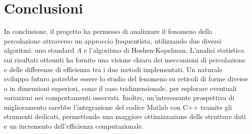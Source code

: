\section{Conclusioni}

In conclusione, il progetto ha permesso di analizzare 
il fenomeno della percolazione attraverso un approccio frequentista, 
utilizzando due diversi algoritmi: uno standard $A$ e l'algoritmo di Hoshen-Kopelman. 
L'analisi statistica sui risultati ottenuti ha fornito una visione chiara dei 
meccanismi di percolazione e delle differenze di efficienza tra i due 
metodi implementati. Un naturale sviluppo futuro potrebbe essere lo studio 
del fenomeno su reticoli di forme diverse o in dimensioni superiori, come 
il caso tridimensionale, per esplorare eventuali variazioni nei comportamenti
osservati. Inoltre, un'interessante prospettiva di miglioramento sarebbe 
l'integrazione del codice Matlab con C++ tramite gli strumenti dedicati, 
permettendo una maggiore ottimizzazione delle strutture dati e 
un incremento dell’efficienza computazionale.